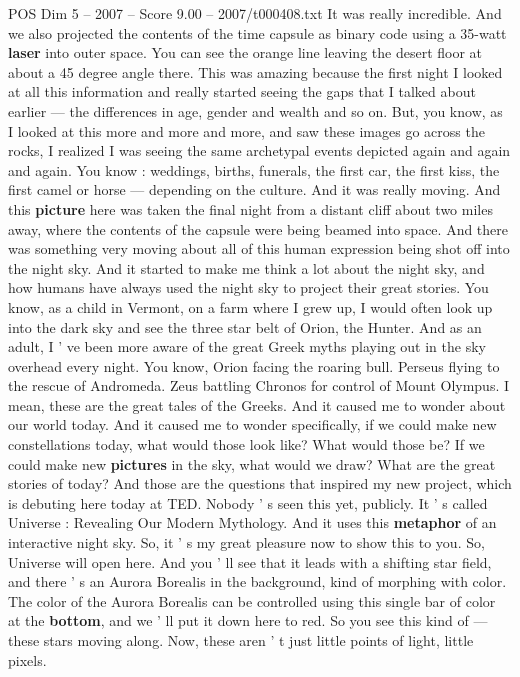\begin{textsample}{POS Dim 5 – 2007 – Score 9.00 – 2007/t000408.txt}
It was really incredible.
And we also projected the contents of the time capsule as binary code using a 35-watt \textbf{laser} into outer space.
You can see the orange line leaving the desert floor at about a 45 degree angle there.
This was amazing because the first night I looked at all this information and really started seeing the gaps that I talked about earlier — the differences in age, gender and wealth and so on.
But, you know, as I looked at this more and more and more, and saw these images go across the rocks, I realized I was seeing the same archetypal events depicted again and again and again.
You know : weddings, births, funerals, the first car, the first kiss, the first camel or horse — depending on the culture.
And it was really moving.
And this \textbf{picture} here was taken the final night from a distant cliff about two miles away, where the contents of the capsule were being beamed into space.
And there was something very moving about all of this human expression being shot off into the night sky.
And it started to make me think a lot about the night sky, and how humans have always used the night sky to project their great stories.
You know, as a child in Vermont, on a farm where I grew up, I would often look up into the dark sky and see the three star belt of Orion, the Hunter.
And as an adult, I ' ve been more aware of the great Greek myths playing out in the sky overhead every night.
You know, Orion facing the roaring bull.
Perseus flying to the rescue of Andromeda.
Zeus battling Chronos for control of Mount Olympus.
I mean, these are the great tales of the Greeks.
And it caused me to wonder about our world today.
And it caused me to wonder specifically, if we could make new constellations today, what would those look like?
What would those be?
If we could make new \textbf{pictures} in the sky, what would we draw?
What are the great stories of today?
And those are the questions that inspired my new project, which is debuting here today at TED.
Nobody ' s seen this yet, publicly.
It ' s called Universe : Revealing Our Modern Mythology.
And it uses this \textbf{metaphor} of an interactive night sky.
So, it ' s my great pleasure now to show this to you.
So, Universe will open here.
And you ' ll see that it leads with a shifting star field, and there ' s an Aurora Borealis in the background, kind of morphing with color.
The color of the Aurora Borealis can be controlled using this single bar of color at the \textbf{bottom}, and we ' ll put it down here to red.
So you see this kind of — these stars moving along.
Now, these aren ' t just little points of light, little pixels.

\end{textsample}
